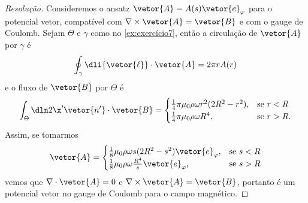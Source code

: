 \begin{proof}[Resolução]
    Consideremos o ansatz \(\vetor{A} = A(s) \vetor{e}_\varphi\) para o potencial vetor, compatível com \(\nabla \times \vetor{A} = \vetor{B}\) e com o gauge de Coulomb. Sejam \(\Theta\) e \(\gamma\) como no \cref{ex:exercício7}, então a circulação de \(\vetor{A}\) por \(\gamma\) é
    \begin{equation*}
        \oint_{\gamma} \dli{\vetor{\ell}}\cdot\vetor{A} = 2\pi r A(r)
    \end{equation*}
    e o fluxo de \(\vetor{B}\) por \(\Theta\) é
    \begin{equation*}
        \int_{\Theta}\dln2{\x'} \vetor{n'}\cdot \vetor{B} = \begin{cases}
            \frac14\pi\mu_0 \rho \omega r^2 (2R^2 - r^2),&\text{se }r < R\\
            \frac14\pi\mu_0 \rho \omega R^4,&\text{se }r > R.
        \end{cases}
    \end{equation*}
    Assim, se tomarmos
    \begin{equation*}
        \vetor{A} = \begin{cases}
            \frac18 \mu_0 \rho \omega s (2 R^2 - s^2)\vetor{e}_\varphi,&\text{se }s < R\\
            \frac18 \mu_0 \rho \omega \frac{R^4}{s}\vetor{e}_\varphi,&\text{se }s > R
        \end{cases}
    \end{equation*}
    vemos que \(\nabla \cdot \vetor{A} = 0\) e \(\nabla \times \vetor{A} = \vetor{B}\), portanto é um potencial vetor no gauge de Coulomb para o campo magnético.
\end{proof}
